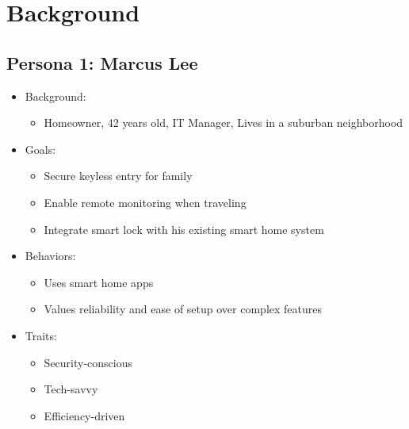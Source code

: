 \newpage
\section{Background}

\subsection*{Persona 1: Marcus Lee}

\begin{itemize}
    \item Background: 
    \begin{itemize}
        \item Homeowner, 42 years old, IT Manager, Lives in a suburban neighborhood
    \end{itemize}

    \item Goals:
    \begin{itemize}
        \item Secure keyless entry for family
        \item Enable remote monitoring when traveling
        \item Integrate smart lock with his existing smart home system
    \end{itemize}

    \item Behaviors:
    \begin{itemize}
        \item Uses smart home apps
        \item Values reliability and ease of setup over complex features
    \end{itemize}

    \item Traits:
    \begin{itemize}
        \item Security-conscious
        \item Tech-savvy
        \item Efficiency-driven
    \end{itemize}
\end{itemize}


